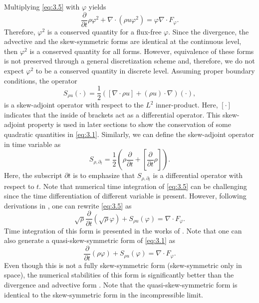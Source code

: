 Multiplying \eqref{eq:3.5} with $\varphi$ yields
\begin{equation}
	\frac{\partial }{\partial t} \rho \varphi^2 + \nabla \cdot ( \rho u \varphi^2  ) = \varphi \nabla \cdot F_{\varphi}.
\end{equation}
Therefore, $\varphi^2$ is a conserved quantity for a flux-free $\varphi$. Since the divergence, the advective and the skew-symmetric forms are identical at the continuous level, then $\varphi^2$ is a conserved quantity for all forms. However, equivalence of these forms is not preserved through a general discretization scheme and, therefore, we do not expect $\varphi^2$ to be a conserved quantity in discrete level. Assuming proper boundary conditions, the operator 
\begin{equation}
	S_{\rho u}(\cdot) = \frac 1 2 ( [ \nabla \cdot \rho u ] + (\rho u)\cdot \nabla )(\cdot),
\end{equation}
is a skew-adjoint operator with respect to the $L^2$ inner-product. Here, $[\cdot]$ indicates that the inside of brackets act as a differential operator. This skew-adjoint property is used in later sections to show the conservation of some quadratic quantities in \eqref{eq:3.1}. Similarly, we can define the skew-adjoint operator in time variable as
\begin{equation}
	S_{\rho,\partial_t} = \frac{1}{2} \left( \rho \frac{\partial}{\partial t} + [ \frac{\partial}{\partial t} \rho] \right).
\end{equation}
Here, the subscript $\partial t$ is to emphasize that $S_{\rho,\partial_t}$ is a differential operator with respect to $t$. Note that numerical time integration of \eqref{eq:3.5} can be challenging since the time differentiation of different variable is present. However, following derivations in \cite{morinishi2010skew}, one can rewrite \eqref{eq:3.5} as
\begin{equation} \label{eq:3.6}
	\sqrt{\rho } \frac{\partial }{\partial t} (\sqrt \rho \varphi ) + S_{\rho u}(\varphi) = \nabla \cdot F_{\varphi}.
\end{equation}
Time integration of this form is presented in the works of \cite{?}. Note that one can also generate a quasi-skew-symmetric form \cite{blaisdell1991numerical,morinishi2003dns} of \eqref{eq:3.1} as
\begin{equation} \label{eq:3.7}
	\frac{\partial }{\partial t} (\rho \varphi) + S_{\rho u}(\varphi) = \nabla \cdot F_{\varphi}.
\end{equation}
Even though this is not a fully skew-symmetric form (skew-symmetric only in space), the numerical stabilities of this form is significantly better than the divergence and advective form \cite{morinishi2010skew,blaisdell1991numerical,morinishi2003dns}. Note that the quasi-skew-symmetric form is identical to the skew-symmetric form in the incompressible limit.

